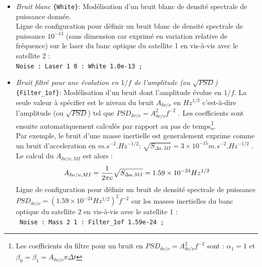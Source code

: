 \documentclass[a4paper,english,12pt]{article}
\begin{document}
\begin{itemize}

\item { \it Bruit blanc }  \texttt{\{White\}}: Mod\'elisation d'un bruit blanc de densit\'e spectrale de puissance donn\'ee.\\
Ligne de configuration pour d\'efinir un bruit blanc de densit\'e spectrale de puissance $10^{-13}$ (sans dimension car exprim\'e en variation relative de fr\'equence) sur le laser du banc optique du satellite 1 en vis-\`a-vis avec le satellite 2 :\\
\hphantom{aaaaa}\texttt{Noise : Laser 1 0 : White 1.0e-13 ;}  \\

\item { \it Bruit filtr\'e pour une \'evolution en $1/f$ de l'amplitude (ou $\sqrt{PSD}$)} \texttt{\{Filter\_1of\}}: Mod\'elisation d'un bruit dont l'amplitude \'evolue en $1/f$. La seule valeur \`a sp\'ecifier est le niveau du bruit $A_{\delta \nu / \nu}$ en $Hz^{1/2}$  c'est-\`a-dire l'amplitude (ou $\sqrt{PSD}$) tel que $PSD_{\delta \nu / \nu} = A^2_{\delta \nu / \nu} f^{-2}$ . Les coefficients sont ensuite automatiquement calcul\'es par rapport au pas de temps\footnote{Les coefficients du filtre pour un bruit en $PSD_{\delta \nu / \nu} = A^2_{\delta \nu / \nu} f^{-2}$ sont : $\alpha_{1} = 1$ et $\beta_{0} = \beta_{1} = {A_{\delta \nu / \nu} \pi \Delta t} $ }.\\
Par exemple, le bruit d'une masse inertielle est generalement exprime comme un bruit d'acceleration en $m.s^{-2}.Hz^{-1/2}$: $\sqrt{S_{\Delta a , MI }} = 3 \times 10^{-15} m.s^{-2}.Hz^{-1/2}$ . Le calcul du $A_{\delta \nu / \nu , MI}$ est alors : 
\begin{equation}
A_{\delta \nu / \nu , MI} = {1 \over 2 \pi c} \sqrt{S_{\Delta a , MI }} = 1.59 \times 10^{-24} Hz^{1/2}
\end{equation}
Ligne de configuration pour d\'efinir un bruit de densit\'e spectrale de puissance $PSD_{\delta \nu / \nu} = \left( 1.59 \times 10^{-24} Hz^{1/2}\right)^2 f^{-2}$ sur les masses inertielles du banc optique du satellite 2 en vis-\`a-vis avec le satellite 1 : \\
\hphantom{aaaaa}\texttt{ Noise : Mass 2 1 : Filter\_1of 1.59e-24 ;} \\


\end{itemize}
\end{document}
